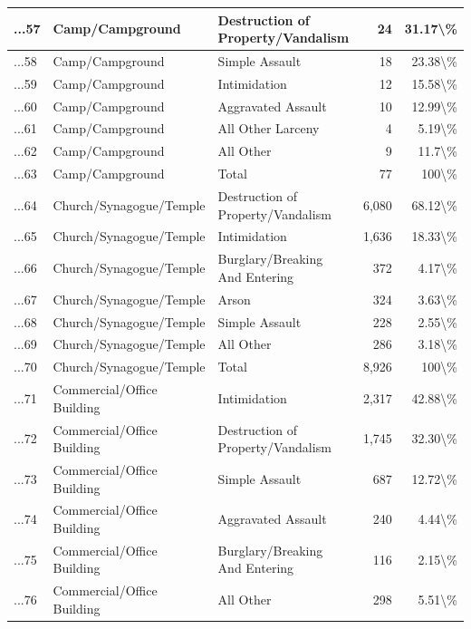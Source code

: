 \documentclass[
]{krantz}
\begin{document}
\begin{longtable}[t]{l|l|l|r|r}
\hline
...57 & Camp/Campground & Destruction of Property/Vandalism & 24 & 31.17\textbackslash{}\%\\
\hline
...58 & Camp/Campground & Simple Assault & 18 & 23.38\textbackslash{}\%\\
\hline
...59 & Camp/Campground & Intimidation & 12 & 15.58\textbackslash{}\%\\
\hline
...60 & Camp/Campground & Aggravated Assault & 10 & 12.99\textbackslash{}\%\\
\hline
...61 & Camp/Campground & All Other Larceny & 4 & 5.19\textbackslash{}\%\\
\hline
...62 & Camp/Campground & All Other & 9 & 11.7\textbackslash{}\%\\
\hline
...63 & Camp/Campground & Total & 77 & 100\textbackslash{}\%\\
\hline
...64 & Church/Synagogue/Temple & Destruction of Property/Vandalism & 6,080 & 68.12\textbackslash{}\%\\
\hline
...65 & Church/Synagogue/Temple & Intimidation & 1,636 & 18.33\textbackslash{}\%\\
\hline
...66 & Church/Synagogue/Temple & Burglary/Breaking And Entering & 372 & 4.17\textbackslash{}\%\\
\hline
...67 & Church/Synagogue/Temple & Arson & 324 & 3.63\textbackslash{}\%\\
\hline
...68 & Church/Synagogue/Temple & Simple Assault & 228 & 2.55\textbackslash{}\%\\
\hline
...69 & Church/Synagogue/Temple & All Other & 286 & 3.18\textbackslash{}\%\\
\hline
...70 & Church/Synagogue/Temple & Total & 8,926 & 100\textbackslash{}\%\\
\hline
...71 & Commercial/Office Building & Intimidation & 2,317 & 42.88\textbackslash{}\%\\
\hline
...72 & Commercial/Office Building & Destruction of Property/Vandalism & 1,745 & 32.30\textbackslash{}\%\\
\hline
...73 & Commercial/Office Building & Simple Assault & 687 & 12.72\textbackslash{}\%\\
\hline
...74 & Commercial/Office Building & Aggravated Assault & 240 & 4.44\textbackslash{}\%\\
\hline
...75 & Commercial/Office Building & Burglary/Breaking And Entering & 116 & 2.15\textbackslash{}\%\\
\hline
...76 & Commercial/Office Building & All Other & 298 & 5.51\textbackslash{}\%\\

\end{longtable}
\end{document}
